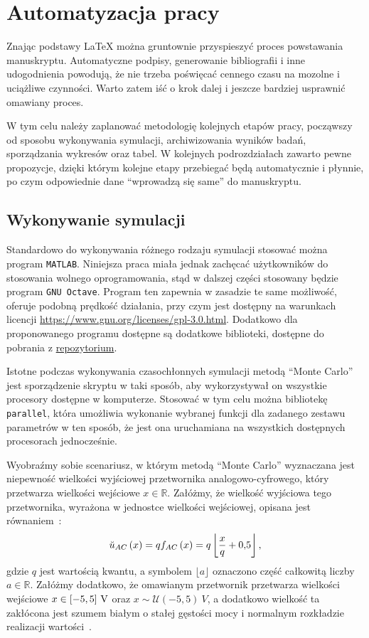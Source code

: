 \chapter{Automatyzacja pracy}

Znając podstawy \LaTeX{} można gruntownie przyspieszyć proces powstawania manuskryptu. Automatyczne podpisy, generowanie bibliografii i inne udogodnienia powodują, że nie trzeba poświęcać cennego czasu na mozolne i uciążliwe czynności. Warto zatem iść o krok dalej i jeszcze bardziej usprawnić omawiany proces.

W tym celu należy zaplanować metodologię kolejnych etapów pracy, począwszy od sposobu wykonywania symulacji, archiwizowania wyników badań, sporządzania wykresów oraz tabel. W kolejnych podrozdziałach zawarto pewne propozycje, dzięki którym kolejne etapy przebiegać będą automatycznie i płynnie, po czym odpowiednie dane \enquote{wprowadzą się same} do manuskryptu.

\section{Wykonywanie symulacji}

Standardowo do wykonywania różnego rodzaju symulacji stosować można program \texttt{MATLAB}. Niniejsza praca miała jednak zachęcać użytkowników do stosowania wolnego oprogramowania, stąd w dalszej części stosowany będzie program \texttt{GNU Octave}. Program ten zapewnia w zasadzie te same możliwość, oferuje podobną prędkość działania, przy czym jest dostępny na warunkach licencji \href{GNU GPLv3}{https://www.gnu.org/licenses/gpl-3.0.html}. Dodatkowo dla proponowanego programu dostępne są dodatkowe biblioteki, dostępne do pobrania z \href{https://octave.sourceforge.io/packages.php}{repozytorium}.

Istotne podczas wykonywania czasochłonnych symulacji metodą \enquote{Monte Carlo}~\cite{jcgm_montecarlo} jest sporządzenie skryptu w taki sposób, aby wykorzystywał on wszystkie procesory dostępne w komputerze. Stosować w tym celu można bibliotekę \texttt{parallel}, która umożliwia wykonanie wybranej funkcji dla zadanego zestawu parametrów w ten sposób, że jest ona uruchamiana na wszystkich dostępnych procesorach jednocześnie.

Wyobraźmy sobie scenariusz, w którym metodą \enquote{Monte Carlo} wyznaczana jest niepewność wielkości wyjściowej przetwornika analogowo-cyfrowego, który przetwarza wielkości wejściowe $x \in \mathbb{R}$. Załóżmy, że wielkość wyjściowa tego przetwornika, wyrażona w jednostce wielkości wejściowej, opisana jest równaniem~\cite{jakubiec_error}:
\begin{equation}
\breve{u}_{AC} \left(x\right) = q f_{AC} \left(x\right) = q \left\lfloor \frac{x}{q} + \num{0.5} \right\rfloor \label{eq:adc_output},
\end{equation}
gdzie $q$ jest wartością kwantu, a symbolem $\lfloor a \rfloor$ oznaczono część całkowitą liczby $a \in \mathbb{R}$. Załóżmy dodatkowo, że omawianym przetwornik przetwarza wielkości wejściowe $x \in \interval{-5}{5}~\unit{V}$ oraz $x \sim \mathcal{U}(-5, 5)~\unit{V}$, a dodatkowo wielkość ta zakłócona jest szumem białym o stałej gęstości mocy i normalnym rozkładzie realizacji wartości~\cite{kuo_white, grimmett_probability}.


